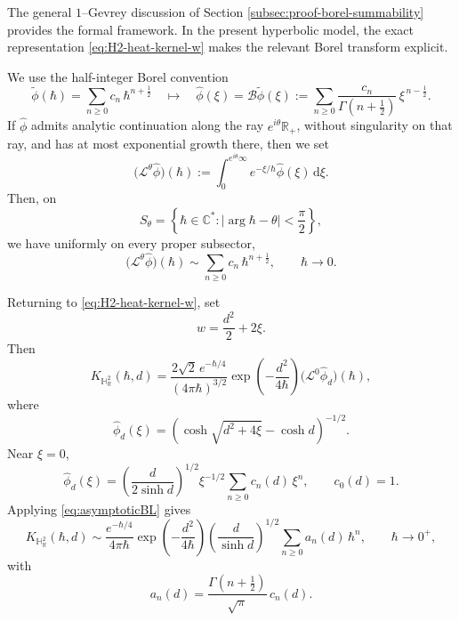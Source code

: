 \documentclass[11pt]{amsart}
\theoremstyle{plain}
\theoremstyle{definition}
\newcommand{\R}{\mathbb{R}}
\newcommand{\C}{\mathbb{C}}
\newcommand{\dd}{\mathrm d}
\newcommand{\HH}{\mathbb{H}}
\begin{document}
\smallskip

The general $1$--Gevrey discussion of Section \ref{subsec:proof-borel-summability} provides the
formal framework.  In the present hyperbolic model, the exact representation
\eqref{eq:H2-heat-kernel-w} makes the relevant Borel transform explicit.

We use the half-integer Borel convention
\[
\widetilde\phi(\hbar)
=\sum_{n\ge0}c_n\,\hbar^{n+\frac12}
\quad \mapsto\quad
\widehat\phi(\xi)
=\mathcal B\widetilde\phi(\xi)
:=\sum_{n\ge0}
\frac{c_n}{\Gamma\!\left(n+\frac12\right)}
\,\xi^{\,n-\frac12}.
\]
If $\widehat\phi$ admits analytic continuation along the ray 
$e^{i\theta}\R_+$, without singularity on that ray, and has at most
exponential growth there, then we set
\begin{equation*}\label{eq:directional-laplace}
\bigl(\mathcal L^\theta\widehat\phi\bigr)(\hbar)
:=\int_0^{e^{i\theta}\infty}
e^{-\xi/\hbar}\widehat\phi(\xi)\,\dd\xi.
\end{equation*}
Then, on
\[
S_\theta=\left\{\hbar\in\C^*:\left|\arg\hbar-\theta\right|<\frac{\pi}{2}\right\},
\]
we have uniformly on every proper subsector,
\begin{equation}\label{eq:asymptoticBL}
\bigl(\mathcal L^\theta\widehat\phi\bigr)(\hbar)\sim\sum_{n\ge0}c_n\,\hbar^{n+\frac12},
\qquad\hbar\to0.
\end{equation}

\smallskip

Returning to \eqref{eq:H2-heat-kernel-w}, set
\[w=\frac{d^2}{2}+2\xi.\]
Then
\begin{equation}\label{eq:H2-heat-kernel-borel-laplace}
K_{\HH_{\R}^{2}}(\hbar,d)
=\frac{2\sqrt{2}\,e^{-\hbar/4}}{(4\pi\hbar)^{3/2}}
\exp\!\left(-\frac{d^2}{4\hbar}\right)
\bigl(\mathcal L^0\widehat\phi_d\bigr)(\hbar),
\end{equation}
where
\begin{equation}\label{eq:H2-borel-germ}
\widehat\phi_d(\xi)
=\left(\cosh\sqrt{d^2+4\xi}-\cosh d\right)^{-1/2}.
\end{equation}
Near $\xi=0$,
\[
\widehat\phi_d(\xi)
=\left(\frac{d}{2\sinh d}\right)^{1/2}
\xi^{-1/2}\sum_{n\ge0}c_n(d)\,\xi^n,
\qquad c_0(d)=1.
\]
Applying \eqref{eq:asymptoticBL} gives
\begin{equation*}\label{eq:H2-short-time-expansion}
K_{\HH_{\R}^{2}}(\hbar,d)
\sim
\frac{e^{-\hbar/4}}{4\pi\hbar}
\exp\!\left(-\frac{d^{2}}{4\hbar}\right)
\left(\frac{d}{\sinh d}\right)^{1/2}
\sum_{n\ge0}a_n(d)\,\hbar^n,
\qquad
\hbar\to0^+,
\end{equation*}
with
\begin{equation*}\label{eq:H2-an-cn-relation}
a_n(d)=\frac{\Gamma\left(n+\frac12\right)}{\sqrt{\pi}}\,c_n(d).
\end{equation*}
\end{document}
